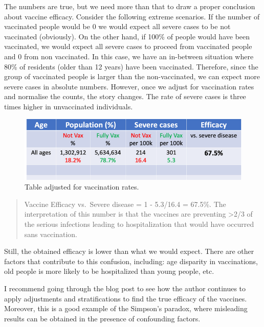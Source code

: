 \documentclass[
]{book}
\begin{document}
The numbers are true, but we need more than that to draw a proper conclusion about vaccine efficacy. Consider the following extreme scenarios. If the number of vaccinated people would be 0 we would expect all severe cases to be not vaccinated (obviously). On the other hand, if 100\% of people would have been vaccinated, we would expect all severe cases to proceed from vaccinated people and 0 from non vaccinated. In this case, we have an in-between situation where 80\% of residents (older than 12 years) have been vaccinated. Therefore, since the group of vaccinated people is larger than the non-vaccinated, we can expect more severe cases in absolute numbers. However, once we adjust for vaccination rates and normalise the counts, the story changes. The rate of severe cases is three times higher in unvaccinated individuals.

\begin{figure}

{\centering \includegraphics[width=0.7\linewidth]{Figures/vaccines-ex-fig2} 

}

\caption{Table adjusted for vaccination rates.}\label{fig:vaccine-rates-b}
\end{figure}

\begin{quote}
Vaccine Efficacy vs.~Severe disease = 1 - 5.3/16.4 = 67.5\%.
The interpretation of this number is that the vaccines are preventing \textgreater2/3 of the serious infections leading to hospitalization that would have occurred sans vaccination.
\end{quote}

Still, the obtained efficacy is lower than what we would expect. There are other factors that contribute to this confusion, including: age disparity in vaccinations, old people is more likely to be hospitalized than young people, etc.

I recommend going through the blog post to see how the author continues to apply adjustments and stratifications to find the true efficacy of the vaccines. Moreover, this is a good example of the Simpson's paradox, where misleading results can be obtained in the presence of confounding factors.
\end{document}
